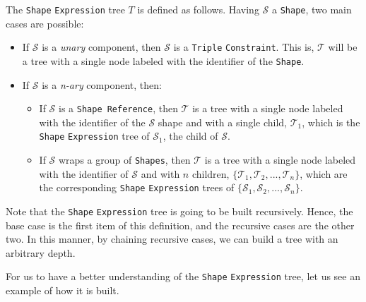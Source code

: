 \begin{definition}
    The \texttt{Shape} \texttt{Expression} tree $T$ is defined as follows. Having $\mathcal{S}$ a \texttt{Shape}, two main cases are possible:

    \begin{itemize}
        \itemsep0.5em
        \item If $\mathcal{S}$ is a \textit{unary} component, then $\mathcal{S}$ is a \texttt{Triple} \texttt{Constraint}. This is, $\mathcal{T}$ will be a tree with a single node labeled with the identifier of the \texttt{Shape}.
        \item If $\mathcal{S}$ is a \textit{n-ary} component, then:
              \begin{itemize}
                  \itemsep0.25em
                  \item If $\mathcal{S}$ is a \texttt{Shape Reference}, then $\mathcal{T}$ is a tree with a single node labeled with the identifier of the $\mathcal{S}$ shape and with a single child, $\mathcal{T}_1$, which is the \texttt{Shape} \texttt{Expression} tree of $\mathcal{S}_1$, the child of $\mathcal{S}$.
                  \item If $\mathcal{S}$ wraps a group of \texttt{Shapes}, then $\mathcal{T}$ is a tree with a single node labeled with the identifier of $\mathcal{S}$ and with $n$ children, $\{\mathcal{T}_1, \mathcal{T}_2, ..., \mathcal{T}_n\}$, which are the corresponding \texttt{Shape} \texttt{Expression} trees of $\{\mathcal{S}_1, \mathcal{S}_2, ..., \mathcal{S}_n\}$.
              \end{itemize}
    \end{itemize}

    Note that the \texttt{Shape} \texttt{Expression} tree is going to be built recursively. Hence, the base case is the first item of this definition, and the recursive cases are the other two. In this manner, by chaining recursive cases, we can build a tree with an arbitrary depth.
\end{definition}

\vspace*{0.5em}

For us to have a better understanding of the \texttt{Shape} \texttt{Expression} tree, let us see an example of how it is built.

